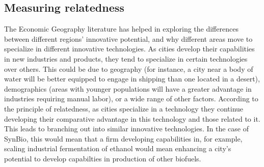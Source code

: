 \documentclass[12pt,a4paper]{article}
\begin{document}
	\subsection{Measuring relatedness}
	The Economic Geography literature has helped in exploring the differences between different regions' innovative potential, and why different areas move to specialize in different innovative technologies. As cities develop their capabilities in new industries and products, they tend to specialize in certain technologies over others. This could be due to geography (for instance, a city near a body of water will be better equipped to engage in shipping than one located in a desert), demographics (areas with younger populations will have a greater advantage in industries requiring manual labor), or a wide range of other factors. According to the principle of relatedness, as cities specialize in a technology they continue developing their comparative advantage in this technology and those related to it. This leads to branching out into similar innovative technologies. In the case of SynBio, this would mean that a firm developing capabilities in, for example, scaling industrial fermentation of ethanol would mean enhancing a city's potential to develop capabilties in production of other biofuels.
	
\end{document}
